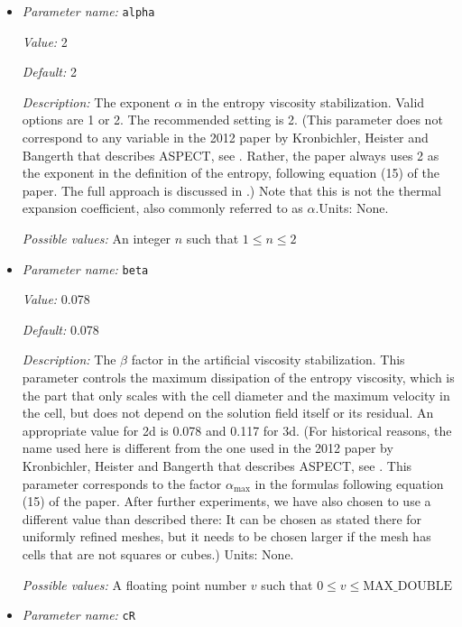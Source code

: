 \begin{itemize}
{\it Possible values:} A boolean value (true or false)
\item {\it Parameter name:} {\tt alpha}
\label{parameters:Discretization/Stabilization parameters/alpha}


{\it Value:} 2


{\it Default:} 2


{\it Description:} The exponent $\alpha$ in the entropy viscosity stabilization. Valid options are 1 or 2. The recommended setting is 2. (This parameter does not correspond to any variable in the 2012 paper by Kronbichler, Heister and Bangerth that describes ASPECT, see \cite{KHB12}. Rather, the paper always uses 2 as the exponent in the definition of the entropy, following equation (15) of the paper. The full approach is discussed in \cite{GPP11}.) Note that this is not the thermal expansion coefficient, also commonly referred to as $\alpha$.Units: None.


{\it Possible values:} An integer $n$ such that $1\leq n \leq 2$
\item {\it Parameter name:} {\tt beta}
\label{parameters:Discretization/Stabilization parameters/beta}


{\it Value:} 0.078


{\it Default:} 0.078


{\it Description:} The $\beta$ factor in the artificial viscosity stabilization. This parameter controls the maximum dissipation of the entropy viscosity, which is the part that only scales with the cell diameter and the maximum velocity in the cell, but does not depend on the solution field itself or its residual. An appropriate value for 2d is 0.078 and 0.117 for 3d. (For historical reasons, the name used here is different from the one used in the 2012 paper by Kronbichler, Heister and Bangerth that describes ASPECT, see \cite{KHB12}. This parameter corresponds to the factor $\alpha_\text {max}$ in the formulas following equation (15) of the paper. After further experiments, we have also chosen to use a different value than described there: It can be chosen as stated there for uniformly refined meshes, but it needs to be chosen larger if the mesh has cells that are not squares or cubes.) Units: None.


{\it Possible values:} A floating point number $v$ such that $0 \leq v \leq \text{MAX\_DOUBLE}$
\item {\it Parameter name:} {\tt cR}
\label{parameters:Discretization/Stabilization parameters/cR}



\end{itemize}
